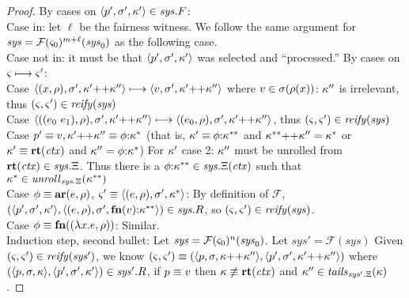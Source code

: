 \begin{proof}
   \noindent By cases on $\langle p',\sigma',\kappa' \rangle \in \mathit{sys}.F$:
\\
    Case in: let $\ell$ be the fairness witness. We follow the same argument for $\mathit{sys}={\mathcal F}(\varsigma_0)^{m+\ell}(\mathit{sys}_0)$ as
              the following case.
\\
    Case not in: it must be that $\langle p',\sigma',\kappa' \rangle$ was selected and ``processed.''
                 By cases on $\varsigma \longmapsto \varsigma'$:
\\
        Case $\langle (x,\rho),\sigma',\kappa' {\tt ++} \kappa'' \rangle \longmapsto \langle v,\sigma',\kappa' {\tt ++} \kappa'' \rangle$ where $v \in \sigma(\rho(x))$:
        $\kappa''$ is irrelevant, thus $(\varsigma,\varsigma') \in \mathit{reify}(\mathit{sys})$
\\
        Case $\tpl{((\mexpri0\ \mexpri1),\menv),\mstore',\append{\mkont'}{\mkont''}} \stepto \tpl{(\mexpri0, \menv),\mstore',\append{\mkont'}{\mkont''}}$,
        thus $(\varsigma,\varsigma') \in \mathit{reify}(\mathit{sys})$
\\
        Case $p'\equiv v, \kappa' {\tt ++} \kappa''\equiv\phi{\tt :} \kappa^*$ (that is, $\kappa' \equiv \phi{\tt :} \kappa^{**}$ and $\kappa^{**} {\tt ++} \kappa''=\kappa^*$ or $\kappa'\equiv\mathbf{rt}(\mathit{ctx})$ and $\kappa''=\phi{\tt :} \kappa^*$)
         For $\kappa'$ case 2: $\kappa''$ must be unrolled from $\mathbf{rt}(\mathit{ctx}) \in \mathit{sys}.\Xi$.
                         Thus there is a $\phi{\tt :} \kappa^{**} \in \mathit{sys}.\Xi(\mathit{ctx})$ such that $\kappa^* \in \mathit{unroll}_{\mathit{sys}.\Xi}(\kappa^{**})$
                         \\
         Case $\phi\equiv\mathbf{ar}{}(e,\rho)$, $\varsigma' \equiv \langle (e,\rho),\sigma',\kappa^* \rangle$:
          By definition of ${\mathcal F}$, $(\langle p',\sigma',\kappa' \rangle, \langle (e,\rho),\sigma',\mathbf{fn}{}(v){\tt :} \kappa^{**} \rangle) \in \mathit{sys}.R$, so $(\varsigma,\varsigma') \in \mathit{reify}(\mathit{sys})$.
\\
         Case $\phi\equiv\mathbf{fn}{}((\lambda{} x. e, \rho))$: Similar.
\\

\noindent  Induction step, second bullet:
Let $\mathit{sys} = {\mathcal F}(\varsigma_0)^n(\mathit{sys}_0)$.
Let $\mathit{sys}' = {\mathcal F}(\mathit{sys})$
Given $(\varsigma,\varsigma') \in \mathit{reify}(\mathit{sys}')$,
%
we know $(\varsigma,\varsigma') \equiv (\langle p,\sigma,\kappa {\tt ++} \kappa'' \rangle,\langle p',\sigma',\kappa' {\tt ++} \kappa'' \rangle)$ where
\\$(\langle p,\sigma,\kappa \rangle,\langle p',\sigma',\kappa' \rangle) \in \mathit{sys}'.R$, if $p \equiv v$ then $\mkont \nequiv \krt{\mctx}$ and $\kappa'' \in \mathit{tails}_{\mathit{sys}'.\Xi}(\kappa)$.


\end{proof}
